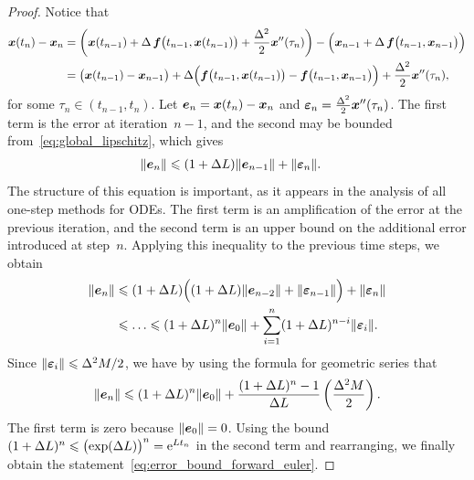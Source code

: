 \begin{proof}
    Notice that
    \begin{align*}
        \mathbf{\boldsymbol{x}}(t_{n}) - \mathbf{\boldsymbol{x}}_{n}
        &= \left( \mathbf{\boldsymbol{x}}(t_{n-1}) + \Delta \, \mathbf{\boldsymbol{f}}\bigl(t_{n-1}, \mathbf{\boldsymbol{x}}(t_{n-1})\bigr) + \frac{\Delta^2}{2} \mathbf{\boldsymbol{x}}''(\tau_n) \right)
        - \Bigl( \mathbf{\boldsymbol{x}}_{n-1} + \Delta \, \mathbf{\boldsymbol{f}}\bigl(t_{n-1}, \mathbf{\boldsymbol{x}}_{n-1}\bigr) \Bigr) \\
        &= \bigl(\mathbf{\boldsymbol{x}}(t_{n-1}) - \mathbf{\boldsymbol{x}}_{n-1}\bigr) + \Delta \Bigl( \mathbf{\boldsymbol{f}}\bigl(t_{n-1}, \mathbf{\boldsymbol{x}}(t_{n-1})\bigr) - \mathbf{\boldsymbol{f}}\bigl(t_{n-1}, \mathbf{\boldsymbol{x}}_{n-1}\bigr) \Bigr) + \frac{\Delta^2}{2} \mathbf{\boldsymbol{x}}''(\tau_n),
    \end{align*}
    for some $\tau_n \in (t_{n-1}, t_n)$.
    Let $\mathbf{\boldsymbol{e}}_n = \mathbf{\boldsymbol{x}}(t_n) - \mathbf{\boldsymbol{x}}_n$ and $\mathbf{\boldsymbol{\varepsilon}}_n = \frac{\Delta^2}{2} \mathbf{\boldsymbol{x}}''(\tau_n)$.
    The first term is the error at iteration~$n-1$,
    and the second may be bounded from~\eqref{eq:global_lipschitz},
    which gives
    \begin{align*}
        \lVert\mathbf{\boldsymbol{e}}_{n}\rVert
        &\leqslant (1 + \Delta L) \lVert\mathbf{\boldsymbol{e}}_{n-1}\rVert
        + \lVert\mathbf{\boldsymbol{\varepsilon}}_n\rVert.
    \end{align*}
    The structure of this equation is important,
    as it appears in the analysis of all one-step methods for ODEs.
    The first term is an amplification of the error at the previous iteration,
    and the second term is an upper bound on the additional error introduced at step~$n$.
    Applying this inequality to the previous time steps, we obtain
    \begin{align}
        \nonumber
        \lVert\mathbf{\boldsymbol{e}}_{n}\rVert
        &\leqslant (1 + \Delta L) \Bigl( (1 + \Delta L) \lVert\mathbf{\boldsymbol{e}}_{n-2}\rVert + \lVert\mathbf{\boldsymbol{\varepsilon}}_{n-1}\rVert \Bigr) + \lVert\mathbf{\boldsymbol{\varepsilon}}_{n}\rVert \\
        \label{eq:sum_local_and_accumulation}
        &\leqslant \dotsc
        \leqslant (1 + \Delta L)^{n} \lVert\mathbf{\boldsymbol{e}}_{0}\rVert + \sum_{i=1}^{n} (1 + \Delta L)^{n-i} \lVert\mathbf{\boldsymbol{\varepsilon}}_{i}\rVert.
    \end{align}
    Since $\lVert\mathbf{\boldsymbol{\varepsilon}}_i\rVert \leqslant \Delta^2M/2$,
    we have by using the formula for geometric series that
    \[
        \lVert\mathbf{\boldsymbol{e}}_{n}\rVert
        \leqslant (1 + \Delta L)^{n} \lVert\mathbf{\boldsymbol{e}}_{0}\rVert + \frac{(1+\Delta L)^{n} - 1}{\Delta L} \left( \frac{\Delta^2 M}{2} \right).
    \]
    The first term is zero because $\lVert\mathbf{\boldsymbol{e}}_{0}\rVert = 0$.
    Using the bound $(1+\Delta L)^n \leqslant \bigl(\exp(\Delta L)\bigr)^n = \mathrm e^{L t_n}$ in the second term and rearranging,
    we finally obtain the statement~\eqref{eq:error_bound_forward_euler}.
\end{proof}

